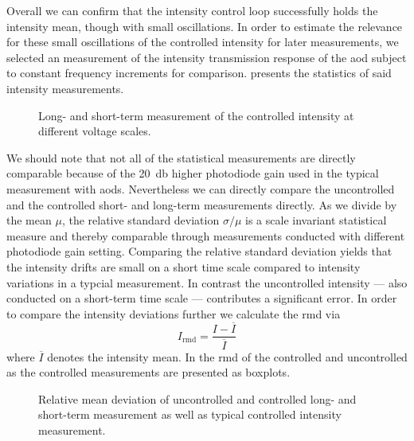 Overall we can confirm that the intensity control loop successfully holds the
intensity mean, though with small oscillations. In order to estimate the
relevance for these small oscillations of the controlled intensity for later
measurements, we selected an measurement of the intensity transmission
response of the \gls{aod} subject to constant frequency increments for
comparison.  presents the statistics of
said intensity measurements.
\begin{figure}[htb]
  \centering
  \begin{adjustbox}{width=\textwidth}
    
  \end{adjustbox}
  \caption{Long- and short-term measurement of the controlled intensity at
    different voltage scales.
  }\label{fig:intensity_control}
\end{figure}
We should note that not all of the statistical measurements are directly
comparable because of the \SI{20}{\decibel} higher photodiode gain used in
the typical measurement with \gls{aod}s. Nevertheless we can directly compare
the uncontrolled and the controlled short- and long-term measurements
directly. As we divide by the mean $\mu$, the relative standard deviation
$\sigma/\mu$ is a scale invariant statistical measure and thereby comparable
through measurements conducted with different photodiode gain setting.
Comparing the relative standard deviation yields that the intensity drifts
are small on a short time scale compared to intensity variations in a typcial
measurement. In contrast the uncontrolled intensity --- also conducted on
a short-term time scale --- contributes a significant error. In order to
compare the intensity deviations further we calculate the \gls{rmd} via
\begin{equation}
  I_\text{rmd}
  =
  \frac{I-\overline{I}}{\overline{I}}
  \label{eq:relative_mean_deviation}
\end{equation}
where $\overline{I}$ denotes the intensity mean. In
 the \gls{rmd} of the controlled and
uncontrolled as the controlled measurements are presented as boxplots.
\begin{figure}[htb]
  \centering
  \begin{adjustbox}{width=\textwidth}
    
  \end{adjustbox}
  \caption{Relative mean deviation of uncontrolled and controlled long- and
    short-term measurement as well as typical controlled intensity measurement.
  }\label{fig:intensity_control_rmd}
\end{figure}
